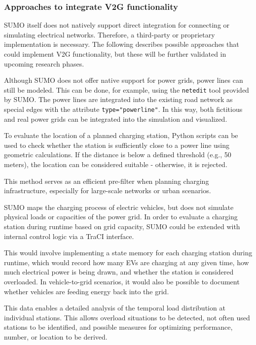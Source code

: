 \subsubsection{Approaches to integrate V2G functionality}
SUMO itself does not natively support direct integration for connecting or simulating electrical networks. Therefore, a third-party or proprietary implementation is necessary. The following describes possible approaches that could implement V2G functionality, but these will be further validated in upcoming research phases.

Although SUMO does not offer native support for power grids, power lines can still be modeled. This can be done, for example, using the \texttt{netedit} tool provided by SUMO. The power lines are integrated into the existing road network as special edges with the attribute \texttt{type="powerline"}. In this way, both fictitious and real power grids can be integrated into the simulation and visualized.

To evaluate the location of a planned charging station, Python scripts can be used to check whether the station is sufficiently close to a power line using geometric calculations. If the distance is below a defined threshold (e.g., 50 meters), the location can be considered suitable - otherwise, it is rejected.

This method serves as an efficient pre-filter when planning charging infrastructure, especially for large-scale networks or urban scenarios.

SUMO maps the charging process of electric vehicles, but does not simulate physical loads or capacities of the power grid. In order to evaluate a charging station during runtime based on grid capacity, SUMO could be extended with internal control logic via a TraCI interface.

This would involve implementing a state memory for each charging station during runtime, which would record how many EVs are charging at any given time, how much electrical power is being drawn, and whether the station is considered overloaded. In vehicle-to-grid scenarios, it would also be possible to document whether vehicles are feeding energy back into the grid.

This data enables a detailed analysis of the temporal load distribution at individual stations. This allows overload situations to be detected, not often used stations to be identified, and possible measures for optimizing performance, number, or location to be derived.

